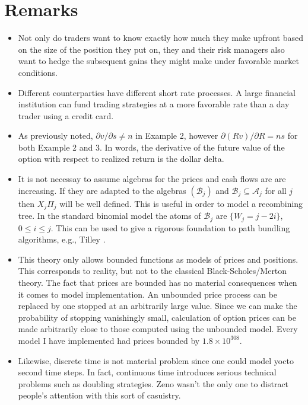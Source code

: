 \documentclass[fleqn]{amsart}
\renewcommand{\AA}{\mathcal{A}}
\newcommand{\BB}{\mathcal{B}}
\begin{document}
\section{Remarks}
\begin{itemize}
\item Not only do
traders want to know exactly how much they make upfront based on the
size of the position they put on, they and their
risk managers also want to hedge the subsequent gains they might make
under favorable market conditions.


\item Different counterparties have different short rate processes.
A large financial institution can fund trading strategies at a
more favorable rate than a day trader using a credit card.

\item As previously noted, $\partial v/\partial s \not= n$ in Example 2,
however $\partial (Rv)/\partial R = ns$ for both Example 2 and 3.
In words, the derivative of the future value of the option with
respect to realized return is the dollar delta.

\item It is not necessay to assume algebras for the prices and cash flows are are increasing.
If they are adapted to the algebras \((\BB_j)\) and
\(\BB_j\subseteq\AA_j\) for all \(j\) then \(X_j\Pi_j\) will
be well defined.
This is useful in order to model a recombining
tree. In the standard binomial model the atoms of $\BB_j$ are $\{W_j =
j - 2i\}$, $0\le i\le j$. This can be used to give a rigorous foundation
to path bundling algorithms, e.g., Tilley \cite{Til1993}.

\item This theory only allows bounded functions as models of prices and
positions. This corresponds to reality, but not to the classical
Black-Scholes/Merton theory. 
The fact that prices are bounded has no material consequences when
it comes to model implementation. An unbounded price
process can be replaced by one stopped at an arbitrarily large value. Since we can make the
probability of stopping vanishingly small, calculation of option prices
can be made arbitrarily close to those computed using the unbounded model.
Every model I have implemented had prices bounded by \(1.8 \times 10^{308}\).

\item Likewise, discrete time is not material problem since one could
model yocto second time steps. In fact, continuous time introduces
serious technical problems such as doubling strategies\cite{HarKre1979}.
Zeno wasn't the only one to distract
people's attention with this sort of casuistry. 


\end{itemize}
\end{document}
